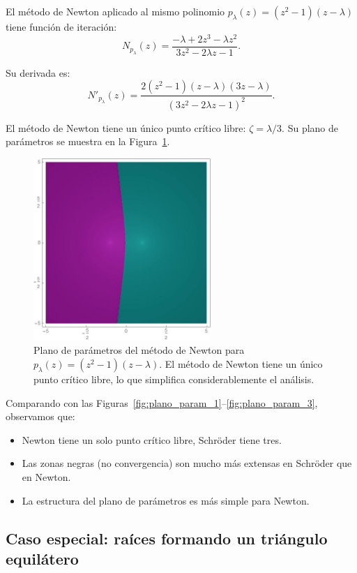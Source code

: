 El método de Newton aplicado al mismo polinomio $p_\lambda(z)=(z^2-1)(z-\lambda)$ tiene función de iteración:
$$
N_{p_\lambda}(z)=\frac{-\lambda+2z^3-\lambda z^2}{3z^2-2\lambda z-1}.
$$

Su derivada es:
$$
N'_{p_\lambda}(z)=\frac{2(z^2-1)(z-\lambda)(3z-\lambda)}{(3z^2-2\lambda z-1)^2}.
$$

El método de Newton tiene un único punto crítico libre: $\zeta=\lambda/3$. Su plano de parámetros se muestra en la Figura~\ref{fig:plano_param_newton}.

\begin{figure}[H]
\centering 
\includegraphics[width=0.6\textwidth]{fuentes/articulo-cuadraticos/imagenes/newton_m_7n_6.jpg}
\caption{Plano de parámetros del método de Newton para $p_\lambda(z)=(z^2-1)(z-\lambda)$. El método de Newton tiene un único punto crítico libre, lo que simplifica considerablemente el análisis.}
\label{fig:plano_param_newton}
\end{figure}

Comparando con las Figuras~\ref{fig:plano_param_1}--\ref{fig:plano_param_3}, observamos que:
\begin{itemize}
\item Newton tiene un solo punto crítico libre, Schröder tiene tres.
\item Las zonas negras (no convergencia) son mucho más extensas en Schröder que en Newton.
\item La estructura del plano de parámetros es más simple para Newton.
\end{itemize}

\subsection{Caso especial: raíces formando un triángulo equilátero}


